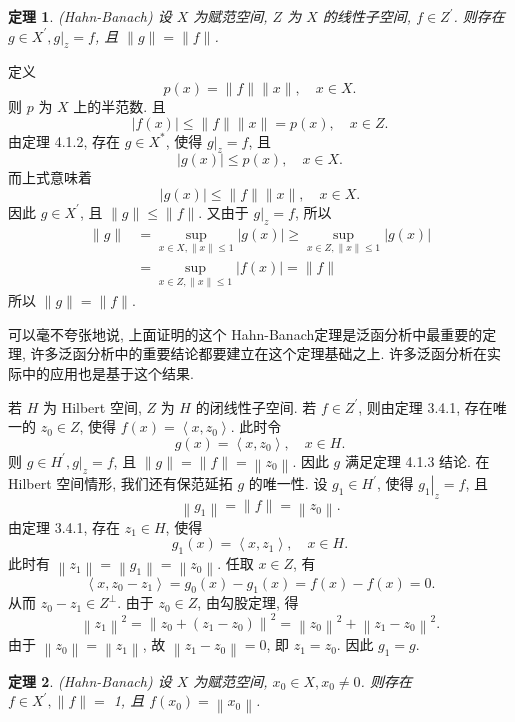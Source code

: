 \documentclass[openany]{ctexbook}
\makeatletter
\theoremstyle{kaiti}
\newtheorem{theorem}{定理}[section]
\theoremstyle{normal}
\renewenvironment{proof}[1][\proofname]{\par
    \pushQED{\qed}%
    \normalfont \topsep6\p@\@plus6\p@\relax
    \trivlist
    \item\relax
    {\heiti #1}\hspace{2\labelsep}\ignorespaces
  }{%
    \popQED\endtrivlist\@endpefalse
  }
\makeatother
\begin{document}
\begin{theorem}
(Hahn-Banach) 设 $X$ 为赋范空间, $Z$ 为 $X$ 的线性子空间, $f \in Z^{\prime}$. 则存在 $g \in X^{\prime},\left.g\right|_{z}=f$, 且 $\|g\|=\|f\|$.
\end{theorem}

\begin{proof}
定义
$$
p(x)=\|f\|\|x\|, \quad x \in X.
$$
则 $p$ 为 $X$ 上的半范数. 且
$$
|f(x)| \leqslant\|f\|\|x\|=p(x), \quad x \in Z.
$$
由定理 4.1.2, 存在 $g \in X^{*}$, 使得 $\left.g\right|_{z}=f$, 且
$$
|g(x)| \leqslant p(x), \quad x \in X.
$$
而上式意味着
$$
|g(x)| \leqslant\|f\|\|x\|, \quad x \in X.
$$
因此 $g \in X^{\prime}$, 且 $\|g\| \leqslant\|f\|$. 又由于 $\left.g\right|_{z}=f$, 所以
$$
\begin{aligned}
\|g\| &=\sup_{x \in X,\|x\| \leqslant 1}|g(x)| \geqslant \sup_{x \in Z,\|x\| \leqslant 1}|g(x)| \\
&=\sup_{x \in Z,\|x\| \leqslant 1}|f(x)|=\|f\|
\end{aligned}
$$
所以 $\|g\|=\|f\|$.
\end{proof}

可以毫不夸张地说, 上面证明的这个 Hahn-Banach定理是泛函分析中最重要的定理, 许多泛函分析中的重要结论都要建立在这个定理基础之上. 许多泛函分析在实际中的应用也是基于这个结果.

若 $H$ 为 Hilbert 空间, $Z$ 为 $H$ 的闭线性子空间. 若 $f \in Z^{\prime}$, 则由定理 3.4.1, 存在唯一的 $z_0 \in Z$, 使得 $f(x)=\left\langle x, z_0\right\rangle$. 此时令
$$
g(x)=\left\langle x, z_0\right\rangle, \quad x \in H.
$$
则 $g \in H^{\prime},\left.g\right|_{z}=f$, 且 $\|g\|=\|f\|=\left\|z_0\right\|$. 因此 $g$ 满足定理 4.1.3 结论. 在 Hilbert 空间情形, 我们还有保范延拓 $g$ 的唯一性. 设 $g_1 \in H^{\prime}$, 使得 $\left.g_1\right|_{z}=f$, 且
$$
\left\|g_1\right\|=\|f\|=\left\|z_0\right\|.
$$
由定理 3.4.1, 存在 $z_1 \in H$, 使得
$$
g_1(x)=\left\langle x, z_1\right\rangle, \quad x \in H.
$$
此时有 $\left\|z_1\right\|=\left\|g_1\right\|=\left\|z_0\right\|$. 任取 $x \in Z$, 有
$$
\left\langle x, z_0-z_1\right\rangle=g_0(x)-g_1(x)=f(x)-f(x)=0.
$$
从而 $z_0-z_1 \in Z^{\perp}$. 由于 $z_0 \in Z$, 由勾股定理, 得
$$
\left\|z_1\right\|^2=\left\|z_0+\left(z_1-z_0\right)\right\|^2=\left\|z_0\right\|^2+\left\|z_1-z_0\right\|^2.
$$
由于 $\left\|z_0\right\|=\left\|z_1\right\|$, 故 $\left\|z_1-z_0\right\|=0$, 即 $z_1=z_0$. 因此 $g_1=g$.

\begin{theorem}
(Hahn-Banach) 设 $X$ 为赋范空间, $x_0 \in X, x_0 \neq 0$. 则存在 $f \in X^{\prime},\|f\|=$ 1, 且 $f\left(x_0\right)=\left\|x_0\right\|$.
\end{theorem}
\end{document}
